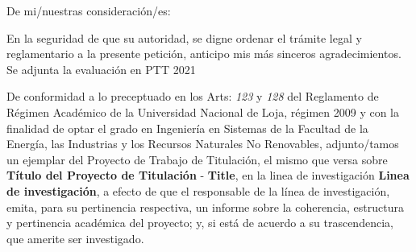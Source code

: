 \documentclass[12pt,a4paper,sans]{moderncv}
\newcommand{\titulo}{Título del Proyecto de Titulación}
\newcommand{\tituloEng}{Title}
\newcommand{\lineaInv}{Linea de investigación}
\begin{document}
\date{Loja, 23 de marzo del 2021}
\opening{De mi/nuestras consideración/es:}
\closing{En la seguridad de que su autoridad, se digne ordenar el trámite legal y reglamentario a la presente petición, anticipo mis más sinceros agradecimientos. Se adjunta la evaluación en PTT 2021}
\makelettertitle

De conformidad a lo preceptuado en los Arts: \textit{123} y \textit{128} del Reglamento de Régimen Académico de la Universidad Nacional de Loja, régimen 2009 y con la finalidad de optar el grado en Ingeniería en Sistemas de la Facultad de la Energía, las Industrias y los Recursos Naturales No Renovables, adjunto/tamos un ejemplar del Proyecto de Trabajo de Titulación, el mismo que versa sobre \textbf{\titulo} - \textbf{\tituloEng}, en la linea de investigación \textbf{\lineaInv}, a efecto de que el responsable de la línea de investigación, emita, para su pertinencia respectiva, un informe sobre la coherencia, estructura y pertinencia académica del proyecto; y, si está de acuerdo a su trascendencia, que amerite ser investigado.

\makeletterclosing
\end{document}
